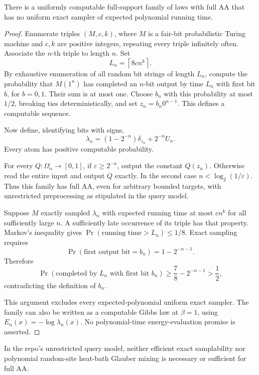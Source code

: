 \begin{proposition}
\label{ian:hard-sector-sampling-not-necessary}
There is a uniformly computable full-support family of laws with full
AA that has no uniform exact sampler of expected polynomial running
time.
\end{proposition}

\begin{proof}
Enumerate triples \((M,c,k)\), where \(M\) is a fair-bit probabilistic
Turing machine and \(c,k\) are positive integers, repeating every
triple infinitely often. Associate the \(n\)-th triple to length \(n\).
Set
\[
 L_n=\left\lceil8cn^k\right\rceil.
\]
By exhaustive enumeration of all random bit strings of length \(L_n\),
compute the probability that \(M(1^n)\) has completed an \(n\)-bit
output by time \(L_n\) with first bit \(b\), for \(b=0,1\).
Their sum is at most one. Choose \(b_n\) with this probability at most
\(1/2\), breaking ties deterministically, and set
\(z_n=b_n0^{n-1}\). This defines a computable sequence.

Now define, identifying bits with signs,
\[
 \lambda_n=(1-2^{-n})\delta_{z_n}+2^{-n}U_n.
\]
Every atom has positive computable probability.

For every \(Q:\Omega_n\to[0,1]\), if
\(\varepsilon\ge2^{-n}\), output the constant \(Q(z_n)\).
Otherwise read the entire input and output \(Q\) exactly. In the
second case \(n<\log_2(1/\varepsilon)\). Thus this family has full AA,
even for arbitrary bounded targets, with unrestricted preprocessing
as stipulated in the query model.

Suppose \(M\) exactly sampled \(\lambda_n\) with expected running time
at most \(cn^k\) for all sufficiently large \(n\). A sufficiently late
occurrence of its triple has that property. Markov's inequality gives
\(\Pr(\text{running time}>L_n)\le1/8\). Exact sampling requires
\[
 \Pr(\text{first output bit}=b_n)
 =1-2^{-n-1}.
\]
Therefore
\[
 \Pr(\text{completed by }L_n
       \text{ with first bit }b_n)
 \ge\frac78-2^{-n-1}>\frac12,
\]
contradicting the definition of \(b_n\).

This argument excludes every expected-polynomial uniform exact
sampler. The family can also be written as a computable Gibbs law
at \(\beta=1\), using \(E_n(x)=-\log\lambda_n(x)\).
No polynomial-time energy-evaluation promise is asserted.
\end{proof}

\begin{corollary}
\label{ian:hard-sector-sampling-separation}
In the repo's unrestricted query model, neither efficient exact
samplability nor polynomial random-site heat-bath Glauber mixing is
necessary or sufficient for full AA.
\end{corollary}

